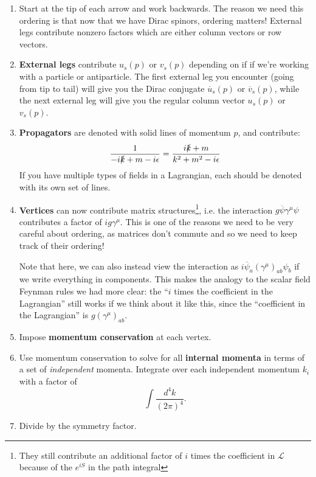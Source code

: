 \documentclass[12pt, oneside]{article}   	%
\theoremstyle{definition}
\begin{document}
	\begin{enumerate}
	
	\item Start at the tip of each arrow and work backwards. The reason we need this ordering is that now that we have Dirac spinors, ordering matters! External legs contribute nonzero factors which are either column vectors or row vectors. 
	
	\item \textbf{External legs} contribute $u_s(p)$ or $v_s(p)$ depending on if if we're working with a particle or antiparticle. The first external leg you encounter (going from tip to tail) will give you the Dirac conjugate $\overline u_s(p)$ or $\overline v_s(p)$, while the next external leg will give you the regular column vector $u_s(p)$ or $v_s(p)$. 
		
	\item \textbf{Propagators} are denoted with solid lines of momentum $p$, and contribute:
	\begin{equation}
		\frac{1}{-i\slashed{k} + m - i\epsilon} = \frac{i\slashed k + m}{k^2 + m^2 - i\epsilon}
	\end{equation}
	If you have multiple types of fields in a Lagrangian, each should be denoted with its own set of lines. 
	
	\item \textbf{Vertices} can now contribute matrix structures\footnote{They still contribute an additional factor of $i$ times the coefficient in $\mathcal L$ because of the $e^{iS}$ in the path integral}, i.e. the interaction $g\overline\psi\gamma^\mu\psi$ contributes a factor of $ig\gamma^\mu$. This is one of the reasons we need to be very careful about ordering, as matrices don't commute and so we need to keep track of their ordering!
	
	Note that here, we can also instead view the interaction as $i\overline\psi_a (\gamma^\mu)_{ab} \psi_b$ if we write everything in components. This makes the analogy to the scalar field Feynman rules we had more clear: the ``$i$ times the coefficient in the Lagrangian'' still works if we think about it like this, since the ``coefficient in the Lagrangian'' is $g(\gamma^\mu)_{ab}$. 
	
	\item Impose \textbf{momentum conservation} at each vertex.
	
	\item Use momentum conservation to solve for all \textbf{internal momenta} in terms of a set of \textit{independent} momenta. Integrate over each independent momentum $k_i$ with a factor of
	\begin{equation}
		\int\frac{d^4k}{(2\pi)^4}.
	\end{equation}
	
	\item Divide by the symmetry factor. 
	\end{enumerate}
\end{document}
